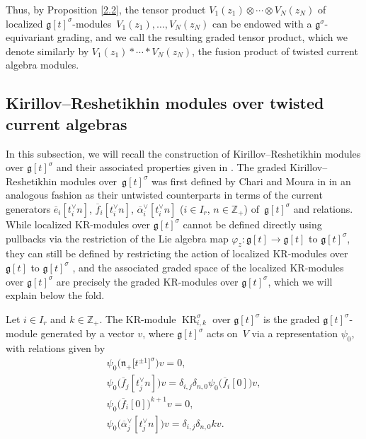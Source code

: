 \documentclass[10pt,a4paper]{amsart}
\numberwithin{equation}{section}
\DeclareMathOperator{\KR}{KR}
\begin{document}
Thus, by Proposition \ref{2.2}, the tensor product $V_1(z_1)\otimes\cdots\otimes V_N(z_N)$ of localized $\mathfrak{g}[t]^{\sigma}$-modules~${V_1(z_1),\dots,V_N(z_N)}$ can be endowed with a $\mathfrak{g}^{\sigma}$-equivariant grading, and we call the resulting graded tensor product, which we denote similarly by $V_1(z_1)*\cdots*V_N(z_N)$, the fusion product of twisted current algebra modules.

\subsection{Kirillov--Reshetikhin modules over twisted current algebras}\label{Section 2.5}

In this subsection, we will recall the construction of Kirillov--Reshetikhin modules over $\mathfrak{g}[t]^{\sigma}$ and their associated properties given in \cite{CM06, CM07, KV16}. The graded Kirillov--Reshetikhin modules over~$\mathfrak{g}[t]^{\sigma}$ was first defined by Chari and Moura in \cite{CM06, CM07} in an analogous fashion as their untwisted counterparts in terms of the current generators $\overline{e}_i[t_i^{\vee}n]$, $\overline{f}_i[t_i^{\vee}n]$, $\overline{\alpha}_i^{\vee}[t_i^{\vee}n]$ ($i\in I_r$, $n\in\mathbb{Z}_+$) of~$\mathfrak{g}[t]^{\sigma}$ and relations. While localized KR-modules over $\mathfrak{g}[t]^{\sigma}$ cannot be defined directly using pullbacks via the restriction of the Lie algebra map $\varphi_z\colon \mathfrak{g}[t]\to\mathfrak{g}[t]$ to $\mathfrak{g}[t]^{\sigma}$, they can still be defined by restricting the action of localized KR-modules over $\mathfrak{g}[t]$ to $\mathfrak{g}[t]^{\sigma}$ \cite[Section 6.5]{KV16}, and the associated graded space of the localized KR-modules over $\mathfrak{g}[t]^{\sigma}$ are precisely the graded KR-modules over $\mathfrak{g}[t]^{\sigma}$, which we will explain below the fold.

\begin{Definition}\label{2.3}
Let $i\in I_r$ and $k\in\mathbb{Z}_+$. The KR-module $\KR_{i,k}^{\sigma}$ over $\mathfrak{g}[t]^{\sigma}$ is the graded $\mathfrak{g}[t]^{\sigma}$-module generated by a vector $v$, where $\mathfrak{g}[t]^{\sigma}$ acts on~$V$ via a representation $\psi_0$, with relations given by
\begin{subequations}\label{eq:2.4}
\begin{gather}
\psi_0\bigl(\mathfrak{n}_+\bigl[t^{\pm1}\bigr]^{\sigma}\bigr)v =0,\\
\psi_0\bigl(\overline{f}_j[t_j^{\vee}n]\bigr)v =\delta_{i,j}\delta_{n,0}\psi_0\bigl(\overline{f}_i[0]\bigr)v,\label{eq:2.4b}\\
\psi_0\bigl(\overline{f}_i[0]\bigr)^{k+1}v =0,\\
\psi_0\bigl(\overline{\alpha}_j^{\vee}[t_j^{\vee}n]\bigr)v =\delta_{i,j}\delta_{n,0}kv.
\end{gather}
\end{subequations}
\end{Definition}
\end{document}
